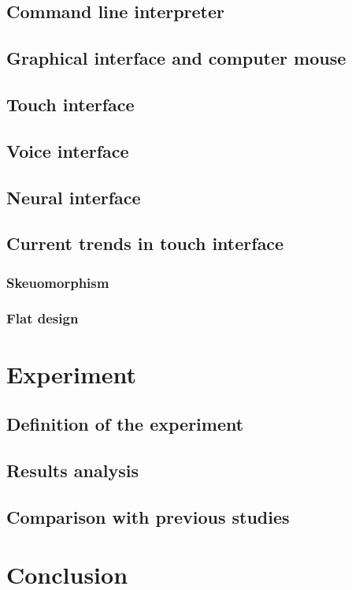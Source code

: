 \documentclass[a4paper,11pt] {article}
\theoremstyle{definition}
\begin{document}
    \subsection{Command line interpreter}
    \subsection{Graphical interface and computer mouse}
    \subsection{Touch interface}
    \subsection{Voice interface}
    \subsection{Neural interface}
    \subsection{Current trends in touch interface}
        \subsubsection{Skeuomorphism}
        \subsubsection{Flat design}


\section{Experiment}
\label{sct:experiment}

    \subsection{Definition of the experiment}
    \subsection{Results analysis}
    \subsection{Comparison with previous studies}

\section{Conclusion}


\end{document}
